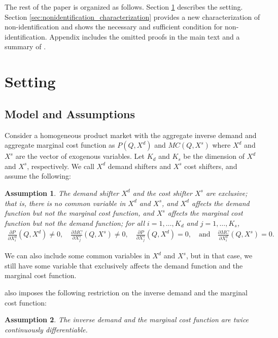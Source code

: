 \documentclass[11pt, a4paper]{article}
\newtheorem{assumption}{Assumption}
\theoremstyle{remark}
\begin{document}
The rest of the paper is organized as follows.
Section \ref{sec:setting} describes the setting.
Section \ref{sec:nonidentification_characterization} provides a new characterization of non-identification and shows the necessary and sufficient condition for non-identification.
Appendix includes the omitted proofs in the main text and a summary of \citet{goldmanNote1964}.




\section{Setting}\label{sec:setting}

\subsection{Model and Assumptions}

Consider a homogeneous product market with the aggregate inverse demand and aggregate marginal cost function as $P(Q, X^{d})$ and $MC(Q, X^{s})$ where $X^{d}$ and $X^{s}$ are the vector of exogenous variables.
Let $K_d$ and $K_s$ be the dimension of $X^{d}$ and $X^{s}$, respectively.
We call $X^{d}$ demand shifters and $X^{s}$ cost shifters, and assume the following:
\begin{assumption}\label{assumption:exclusive_shifters}
    The demand shifter $X^{d}$ and the cost shifter $X^{s}$ are exclusive; that is, there is no common variable in $X^{d}$ and $X^{s}$, and $X^{d}$ affects the demand function but not the marginal cost function, and $X^{s}$ affects the marginal cost function but not the demand function; for all $i = 1, \ldots, K_d$ and $j = 1, \ldots, K_s$,
    \begin{align}
        \frac{\partial P}{\partial X^{d}_{i}}(Q, X^{d}) \ne 0, \quad \frac{\partial MC}{\partial X^{s}_{j}}(Q, X^{s}) \ne 0, \quad \frac{\partial P}{\partial X^{s}_{j}}(Q, X^{d}) = 0, \quad \text{and} \quad \frac{\partial MC}{\partial X^{d}_{i}}(Q, X^{s}) = 0.
    \end{align}
\end{assumption}
We can also include some common variables in $X^{d}$ and $X^{s}$, but in that case, we still have some variable that exclusively affects the demand function and the marginal cost function.

\citet{lau1982identifying} also imposes the following restriction on the inverse demand and the marginal cost function:
\begin{assumption}\label{assumption:twice_differentiable}
    The inverse demand and the marginal cost function are twice continuously differentiable.
\end{assumption}
\end{document}
